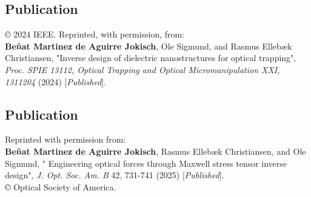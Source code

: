 \newpage

\cleardoublepage
\vspace*{0.4\textheight}
\begin{center}
  \begin{minipage}{0.9\linewidth}
    \section*{Publication \cite{ownpub3}}

    © 2024 IEEE. Reprinted, with permission, from: \\


    \textbf{Beñat Martinez de Aguirre Jokisch}, Ole Sigmund, and Rasmus Ellebæk Christiansen, "Inverse design of dielectric nanostructures for optical trapping", \textit{Proc. SPIE 13112, Optical Trapping and Optical Micromanipulation XXI, 1311204} (2024) [\textit{Published}].
  \end{minipage}
\end{center}
\newpage

\cleardoublepage
\vspace*{0.4\textheight}
\begin{center}
  \begin{minipage}{0.9\linewidth}
    \section*{Publication \cite{ownpub2}}
    Reprinted with permission from:\\ 

    \textbf{Beñat Martinez de Aguirre Jokisch}, Rasmus Ellebæk Christiansen, and Ole Sigmund, "
    Engineering optical forces through Maxwell stress tensor inverse design",  \textit{J. Opt. Soc. Am. B} 42, 731-741 (2025) [\textit{Published}].\\

    © Optical Society of America.

  \end{minipage}
\end{center}
\newpage

\cleardoublepage
\vspace*{0.4\textheight}

